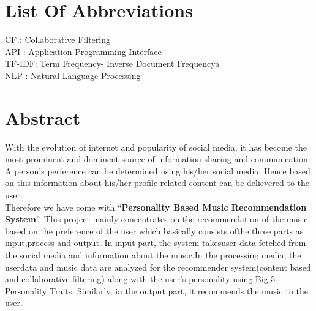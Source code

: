 \documentclass[a4paper,12pt]{article}
\begin{document}
\tableofcontents
\thispagestyle{empty}
\cleardoublepage


\listoffigures
\thispagestyle{empty}
\cleardoublepage

\section*{List Of Abbreviations}
\thispagestyle{empty}
CF : Collaborative Filtering\\
API : Application Programming Interface\\
TF-IDF: Term Frequency- Inverse Document Frequencya\\
NLP : Natural Language Processing\\
\cleardoublepage

\section*{Abstract}
With the evolution of internet and popularity of social media, it has become the most prominent and dominent source of information sharing and communication. A person's perference can be determined using his/her social media. Hence based on this information about his/her profile related content can be delievered to the user.\\
Therefore we have come with ``\textbf{Personality Based Music Recommendation System}''. This project mainly concentrates on the recommendation of the music based on the preference of the user which basically consists ofthe three parts as input,process and output. In input part, the system takesuser data fetched from the social media and information about the music.In the processing media, the userdata and music data are analyzed for the recommender system(content based and collaborative filtering) along with the user's personality using Big 5 Personality Traits. Similarly, in the output part, it recommends the music to the user.
\thispagestyle{empty}
\cleardoublepage
{}
\end{document}
